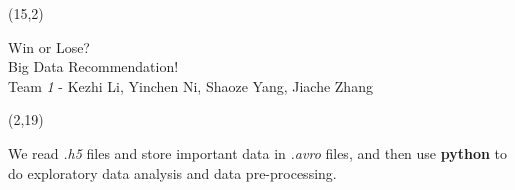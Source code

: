 \documentclass[hyperref={pdfpagelabels=false}]{beamer}
\begin{document}
\begin{frame}

%
%

\begin{textblock}{65}(15,2)
	\begin{blankbox}[fontupper=\comic\fontsize{85}{45}\selectfont,colupper=white!75,halign=center]
		Win or Lose?\\[2mm] Big Data Recommendation! \\
		\vspace{0.5 cm}
		\huge Team \textit{1} - Kezhi Li, Yinchen Ni, Shaoze Yang, Jiache Zhang
	\end{blankbox}
\end{textblock}


\begin{textblock}{45}(2,19)
	\begin{basebox}[title=Data Preparation,opacitybacktitle=.45,colbacktitle=green!10,colframe=grey!65!black, halign title=left]
        We read \textit{.h5} files and store important data in \textit{.avro} files, and then use \textbf{python} to do exploratory data analysis and data pre-processing.
        

\end{basebox}
\end{textblock}
\end{frame}
\end{document}
